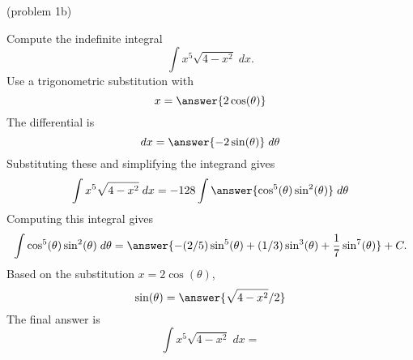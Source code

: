 \documentclass[handout]{ximera}
\begin{document}
\begin{problem}(problem 1b)

Compute the indefinite integral
\[
\int   x^5 \sqrt{4-x^2} \; dx.
\]
Use a trigonometric substitution with\\
\[
x = \answer{2\cos(\theta)}
\]
The differential is\\
\[
dx = \answer{-2\sin(\theta)} \; d\theta
\]
Substituting these and simplifying the integrand gives\\
\[
\int   x^5\sqrt{4 - x^2}\; dx = -128\int \answer{\cos^5(\theta)\sin^2(\theta)} \; d\theta
\]
Computing this integral gives
\[
\int \cos^5(\theta)\sin^2(\theta) \; d\theta = \answer{-(2/5)\sin^5(\theta) + (1/3)\sin^3(\theta) +\frac17 \sin^7(\theta)} + C.
\]
Based on the substitution $x = 2\cos(\theta)$, \\
\[
\sin(\theta) = \answer{\sqrt{4 - x^2}/2}
\]
The final answer is
\[
\int   x^5\sqrt{4 -  x^2}\; dx = 
\]
\begin{center}
\begin{multipleChoice}
\end{multipleChoice}
\end{center}

\end{problem}
\end{document}
